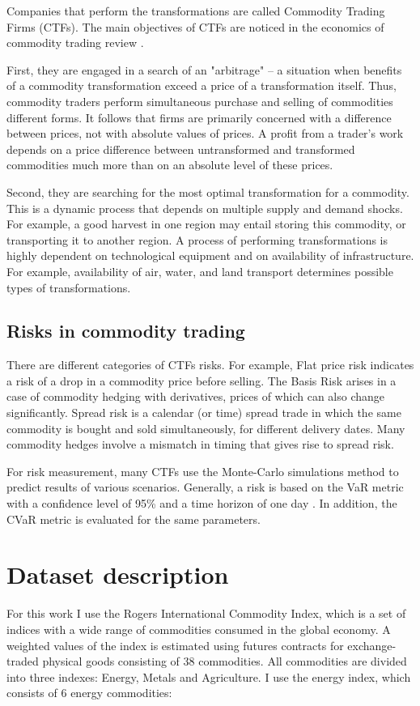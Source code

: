 \documentclass{article}
\begin{document}
Companies that perform the transformations are called Commodity Trading Firms (CTFs). The main objectives of CTFs are noticed in the economics of commodity trading review \cite{Pirrong}.

First, they are engaged in a search of an "arbitrage" -- a situation when benefits of a commodity transformation exceed a price of a transformation itself. Thus, commodity traders perform simultaneous purchase and selling of commodities different forms. It follows that firms are primarily concerned with a difference between prices, not with absolute values of prices. A profit from a trader's work depends on a price difference between untransformed and transformed commodities much more than on an absolute level of these prices.

Second, they are searching for the most optimal transformation for a commodity. This is a dynamic process that depends on multiple supply and demand shocks. For example, a good harvest in one region may entail storing this commodity, or transporting it to another region. A process of performing transformations is highly dependent on technological equipment and on availability of infrastructure. For example, availability of air, water, and land transport determines possible types of transformations.

\subsection{Risks in commodity trading}

There are different categories of CTFs risks. For example, Flat price risk indicates a risk of a drop in a commodity price before selling. The Basis Risk arises in a case of commodity hedging with derivatives, prices of which can also change significantly. Spread risk is a calendar (or time) spread trade in which the same commodity is bought and sold simultaneously, for different delivery dates. Many commodity hedges involve a mismatch in timing that gives rise to spread risk.

For risk measurement, many CTFs use the Monte-Carlo simulations method to predict results of various scenarios. Generally, a risk is based on the VaR metric with a confidence level of 95\% and a time horizon of one day \cite{Pirrong}. In addition, the CVaR metric is evaluated for the same parameters.

\section{Dataset description}
\label{section:dataset}
For this work I use the Rogers International Commodity Index, which is a set of indices with a wide range of commodities consumed in the global economy. A weighted values of the index is estimated using futures contracts for exchange-traded physical goods consisting of 38 commodities. All commodities are divided into three indexes: Energy, Metals and Agriculture. I use the energy \cite{RICI} index, which consists of 6 energy commodities:
\end{document}
